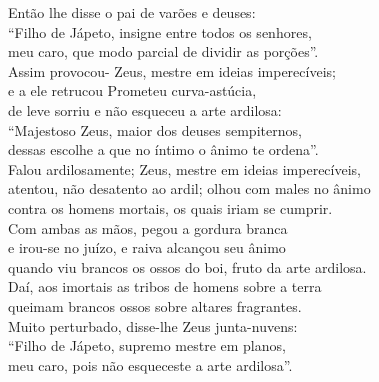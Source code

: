 \begin{pages}
\begin{Rightside}
\quad{}Então lhe disse o pai de varões e deuses:\\
``Filho de Jápeto, insigne entre todos os senhores,\\
meu caro, que modo parcial de dividir as porções''.\\

\quad{}Assim provocou- Zeus, mestre em ideias imperecíveis; \\
e a ele retrucou Prometeu curva-astúcia,\\
de leve sorriu e não esqueceu a arte ardilosa:\\
``Majestoso Zeus, maior dos deuses sempiternos,\\
dessas escolhe a que no íntimo o ânimo te ordena''.\\

\quad{}Falou ardilosamente; Zeus, mestre em ideias imperecíveis, \\
atentou, não desatento ao ardil; olhou com males no ânimo\\
contra os homens mortais, os quais iriam se cumprir.\\
Com ambas as mãos, pegou a gordura branca\\
e irou-se no juízo, e raiva alcançou seu ânimo\\
quando viu brancos os ossos do boi, fruto da arte ardilosa. \\
Daí, aos imortais as tribos de homens sobre a terra\\
queimam brancos ossos sobre altares fragrantes.\\

\quad{}Muito perturbado, disse-lhe Zeus junta-nuvens:\\
``Filho de Jápeto, supremo mestre em planos,\\
meu caro, pois não esqueceste a arte ardilosa''. \\


\end{Rightside}
\end{pages}
